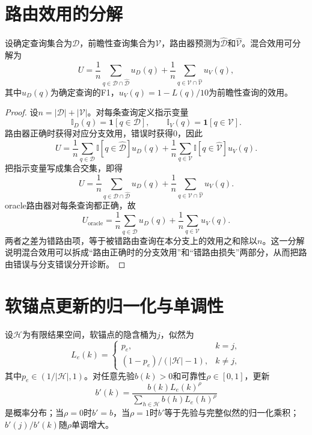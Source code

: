 \section{路由效用的分解}

\begin{proposition}
设确定查询集合为$\mathcal D$，前瞻性查询集合为$\mathcal V$，路由器预测为$\hat{\mathcal D}$和$\hat{\mathcal V}$。混合效用可分解为
\[
U=\frac{1}{n}\sum_{q\in\mathcal D\cap\hat{\mathcal D}}u_D(q)
+\frac{1}{n}\sum_{q\in\mathcal V\cap\hat{\mathcal V}}u_V(q),
\]
其中$u_D(q)$为确定查询的F1，$u_V(q)=1-L(q)/10$为前瞻性查询的效用。
\end{proposition}

\begin{proof}
设$n=|\mathcal D|+|\mathcal V|$。对每条查询定义指示变量
\[
\mathbb I_D(q)=\mathbf 1[q\in\mathcal D],\qquad
\mathbb I_V(q)=\mathbf 1[q\in\mathcal V].
\]
路由器正确时获得对应分支效用，错误时获得0，因此
\[
U=\frac{1}{n}\sum_{q\in\mathcal D}\mathbb I[q\in\hat{\mathcal D}]u_D(q)
+\frac{1}{n}\sum_{q\in\mathcal V}\mathbb I[q\in\hat{\mathcal V}]u_V(q).
\]
把指示变量写成集合交集，即得
\[
U=\frac{1}{n}\sum_{q\in\mathcal D\cap\hat{\mathcal D}}u_D(q)
+\frac{1}{n}\sum_{q\in\mathcal V\cap\hat{\mathcal V}}u_V(q).
\]
oracle路由器对每条查询都正确，故
\[
U_{\text{oracle}}=\frac{1}{n}\sum_{q\in\mathcal D}u_D(q)+\frac{1}{n}\sum_{q\in\mathcal V}u_V(q).
\]
两者之差为错路由项，等于被错路由查询在本分支上的效用之和除以$n$。这一分解说明混合效用可以拆成“路由正确时的分支效用”和“错路由损失”两部分，从而把路由错误与分支错误分开诊断。
\end{proof}

\section{软锚点更新的归一化与单调性}

\begin{proposition}
设$\mathcal H$为有限结果空间，软锚点的隐含桶为$j$，似然为
\[
L_e(k)=
\begin{cases}
p_e, & k=j,\\
(1-p_e)/(|\mathcal H|-1), & k\ne j,
\end{cases}
\]
其中$p_e\in(1/|\mathcal H|,1)$。对任意先验$b(k)>0$和可靠性$\rho\in[0,1]$，更新
\[
b'(k)=\frac{b(k)L_e(k)^\rho}{\sum_{h\in\mathcal H}b(h)L_e(h)^\rho}
\]
是概率分布；当$\rho=0$时$b'=b$，当$\rho=1$时$b'$等于先验与完整似然的归一化乘积；$b'(j)/b'(k)$随$\rho$单调增大。
\end{proposition}

